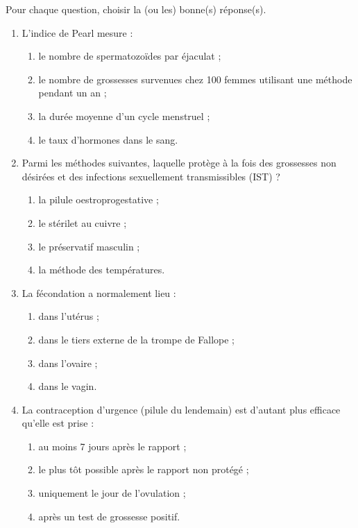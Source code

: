 \documentclass[11pt]{article}
\begin{document}
\begin{exercice}
Pour chaque question, choisir la (ou les) bonne(s) réponse(s).
\begin{enumerate}
\item L'indice de Pearl mesure :
\begin{enumerate}
\item le nombre de spermatozoïdes par éjaculat ;
\item le nombre de grossesses survenues chez 100 femmes utilisant une méthode pendant un an ;
\item la durée moyenne d'un cycle menstruel ;
\item le taux d'hormones dans le sang.
\end{enumerate}
\item Parmi les méthodes suivantes, laquelle protège à la fois des grossesses non désirées et des infections sexuellement transmissibles (IST) ?
\begin{enumerate}
\item la pilule oestroprogestative ;
\item le stérilet au cuivre ;
\item le préservatif masculin ;
\item la méthode des températures.
\end{enumerate}
\item La fécondation a normalement lieu :
\begin{enumerate}
\item dans l'utérus ;
\item dans le tiers externe de la trompe de Fallope ;
\item dans l'ovaire ;
\item dans le vagin.
\end{enumerate}
\item La contraception d'urgence (pilule du lendemain) est d'autant plus efficace qu'elle est prise :
\begin{enumerate}
\item au moins 7 jours après le rapport ;
\item le plus tôt possible après le rapport non protégé ;
\item uniquement le jour de l'ovulation ;
\item après un test de grossesse positif.
\end{enumerate}
\end{enumerate}
\end{exercice}
\end{document}
